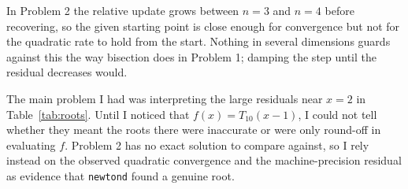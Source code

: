 \documentclass[11pt]{article}
\begin{document}
In Problem 2 the relative update grows between $n = 3$ and $n = 4$ before
recovering, so the given starting point is close enough for convergence but
not for the quadratic rate to hold from the start. Nothing in several
dimensions guards against this the way bisection does in Problem 1; damping the
step until the residual decreases would.

The main problem I had was interpreting the large residuals near $x = 2$ in
Table~\ref{tab:roots}. Until I noticed that $f(x) = T_{10}(x-1)$, I could not
tell whether they meant the roots there were inaccurate or were only round-off
in evaluating $f$. Problem 2 has no exact solution to compare against, so I
rely instead on the observed quadratic convergence and the machine-precision
residual as evidence that \texttt{newtond} found a genuine root.
\end{document}
